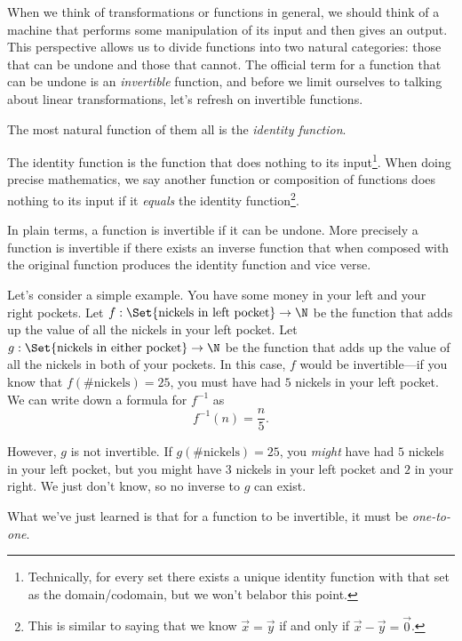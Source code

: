
When we think of transformations or functions in general, we should think of a machine
that performs some manipulation of its input and then gives an output. This perspective 
allows us to divide functions into two natural categories: those that can be undone and
those that cannot. The official term for a function that can be undone is an
\emph{invertible} function, and before we limit ourselves to talking about linear
transformations, let's refresh on invertible functions.


The most natural function of them all is the \emph{identity function}.


The identity function is the function that does nothing to its input\footnote{ Technically, for every
set there exists a unique identity function with that set as the domain/codomain, but we won't
belabor this point.}. When doing precise mathematics, we say another function or composition of functions
does nothing to its input if it \emph{equals} the identity function\footnote{ This is similar to saying that
we know $\vec x=\vec y$ if and only if $\vec x-\vec y=\vec 0$.}.

In plain terms, a function is invertible if it can be undone. More precisely a function
is invertible if there exists an inverse function that when composed with the original function
produces the identity function and vice verse.


Let's consider a simple example. You have some money in your left and
your right pockets. Let $f:\Set{\text{nickels in left pocket}}\to \N$
be the function that adds up the value of all the nickels in your
left pocket. Let $g:\Set{\text{nickels in either pocket}}\to \N$
be the function that adds up the value of all the nickels in both of
your pockets. In this case, $f$ would be invertible---if you know that
$f(\text{\# nickels})=25$, you must have had $5$ nickels in your left pocket. We can write
down a formula for $f^{-1}$ as
\[
	f^{-1}(n)=\frac{n}{5}.
\]

However, $g$ is not invertible. If $g(\text{\# nickels})=25$, you \emph{might}
have had $5$ nickels in your left pocket, but you might have $3$ nickels in your left pocket
and $2$ in your right. We just don't know, so no inverse to $g$ can exist.

What we've just learned is that for a function to be invertible, it must be \emph{one-to-one}.

